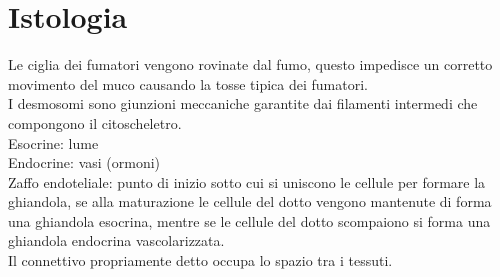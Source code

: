 \documentclass[10pt]{article}
\begin{document}
\section*{Istologia}
Le ciglia dei fumatori vengono rovinate dal fumo, questo impedisce un corretto movimento del muco causando la tosse tipica dei fumatori. \\
I desmosomi sono giunzioni meccaniche garantite dai filamenti intermedi che compongono il citoscheletro.\\
Esocrine: lume \\
Endocrine: vasi (ormoni)\\
Zaffo endoteliale: punto di inizio sotto cui si uniscono le cellule per formare la ghiandola, se alla maturazione le cellule del dotto vengono mantenute di forma una ghiandola esocrina, mentre se le cellule del dotto scompaiono si forma una ghiandola endocrina vascolarizzata. \\ 
Il connettivo propriamente detto occupa lo spazio tra i tessuti.  
\end{document}
